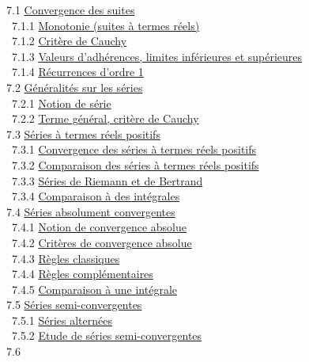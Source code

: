 \documentclass[]{article}
\begin{document}
~7.1 \href{coursse35.html\#x45-2040007.1}{Convergence des suites} \\
~~7.1.1 \href{coursse35.html\#x45-2050007.1.1}{Monotonie (suites à
termes réels)} \\ ~~7.1.2 \href{coursse35.html\#x45-2060007.1.2}{Critère
de Cauchy} \\ ~~7.1.3 \href{coursse35.html\#x45-2070007.1.3}{Valeurs
d'adhérences, limites inférieures et supérieures} \\ ~~7.1.4
\href{coursse35.html\#x45-2080007.1.4}{Récurrences d'ordre 1} \\ ~7.2
\href{coursse36.html\#x46-2090007.2}{Généralités sur les séries} \\
~~7.2.1 \href{coursse36.html\#x46-2100007.2.1}{Notion de série} \\
~~7.2.2 \href{coursse36.html\#x46-2110007.2.2}{Terme général, critère de
Cauchy} \\ ~7.3 \href{coursse37.html\#x47-2120007.3}{Séries à termes
réels positifs} \\ ~~7.3.1
\href{coursse37.html\#x47-2130007.3.1}{Convergence des séries à termes
réels positifs} \\ ~~7.3.2
\href{coursse37.html\#x47-2140007.3.2}{Comparaison des séries à termes
réels positifs} \\ ~~7.3.3 \href{coursse37.html\#x47-2150007.3.3}{Séries
de Riemann et de Bertrand} \\ ~~7.3.4
\href{coursse37.html\#x47-2160007.3.4}{Comparaison à des intégrales} \\
~7.4 \href{coursse38.html\#x48-2170007.4}{Séries absolument
convergentes} \\ ~~7.4.1 \href{coursse38.html\#x48-2180007.4.1}{Notion
de convergence absolue} \\ ~~7.4.2
\href{coursse38.html\#x48-2190007.4.2}{Critères de convergence absolue}
\\ ~~7.4.3 \href{coursse38.html\#x48-2200007.4.3}{Règles classiques} \\
~~7.4.4 \href{coursse38.html\#x48-2210007.4.4}{Règles complémentaires}
\\ ~~7.4.5 \href{coursse38.html\#x48-2220007.4.5}{Comparaison à une
intégrale} \\ ~7.5 \href{coursse39.html\#x49-2230007.5}{Séries
semi-convergentes} \\ ~~7.5.1
\href{coursse39.html\#x49-2240007.5.1}{Séries alternées} \\ ~~7.5.2
\href{coursse39.html\#x49-2250007.5.2}{Etude de séries
semi-convergentes} \\ ~7.6
\end{document}

